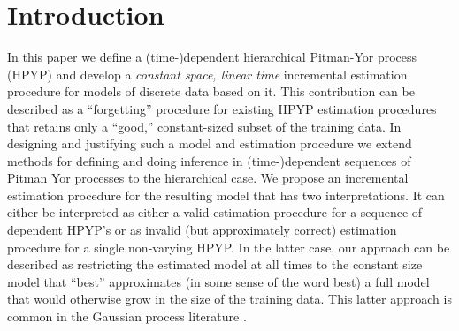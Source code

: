 \section{Introduction}
In this paper we define a  (time-)dependent hierarchical Pitman-Yor process (HPYP) \cite{Teh2006a} and develop a {\em constant space, linear time} incremental estimation procedure for models of discrete data based on it.   This contribution can be described as a ``forgetting'' procedure for existing HPYP estimation procedures that retains only a ``good,'' constant-sized subset of the training data.  In designing and justifying such a model and estimation procedure we extend methods for defining and doing inference in (time-)dependent sequences of Pitman Yor processes \cite{Caron2007, Caron2007a} to the hierarchical case.    We propose an incremental estimation procedure for the resulting model that has two interpretations.  It can either be interpreted as either a valid estimation procedure for a sequence of dependent HPYP's or as invalid (but approximately correct) estimation procedure for a single non-varying HPYP.   In the latter case, our approach can be described as restricting the estimated model at all times  to the constant size model that ``best'' approximates (in some sense of the word best) a full model that would otherwise grow in the size of the training data.  This latter approach is common in the Gaussian process literature \cite{ Lawrence2003, Csat'o2002, Snelson2006}. 

